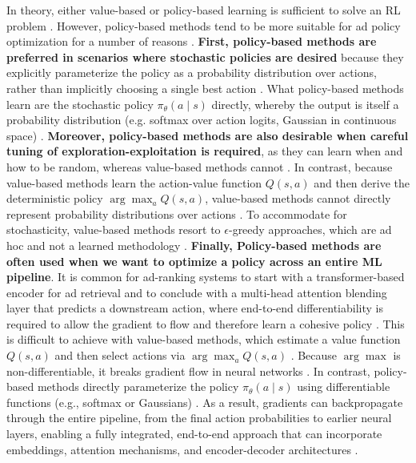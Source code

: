 \documentclass[final]{anthology-ch}         %
\begin{document}
In theory, either value-based or policy-based learning is sufficient to solve an RL problem \cite{Sutton1998, kaelbling1996reinforcement}. However, policy-based methods tend to be more suitable for ad policy optimization for a number of reasons \cite{chen2022off, gauci2018horizon}. \textbf{First, policy-based methods are preferred in scenarios where stochastic policies are desired} because they explicitly parameterize the policy as a probability distribution over actions, rather than implicitly choosing a single best action \cite{williams1992simple, Sutton1998}. What policy-based methods learn are the stochastic policy   $\pi_\theta(a \mid s)$ directly, whereby the output is itself a probability distribution (e.g. softmax over action logits, Gaussian in continuous space) \cite{Sutton1998, schulman2015trust}. \textbf{Moreover, policy-based methods are also desirable when careful tuning of exploration-exploitation is required}, as they can learn when and how to be random, whereas value-based methods cannot \cite{Sutton1998, williams1992simple, schulman2015trust}. In contrast, because value-based methods learn the action-value function $Q(s,a)$ and then derive the deterministic policy $\arg\max_a Q(s, a)$, value-based methods cannot directly represent probability distributions over actions \cite{Sutton1998, dulac2019challenges}. To accommodate for stochasticity, value-based methods resort to $\epsilon$-greedy approaches, which are ad hoc and not a learned methodology \cite{Sutton1998, kaelbling1996reinforcement}. \textbf{Finally, Policy-based methods are often used when we want to optimize a policy across an entire ML pipeline}\cite{Sutton1998, chen2022off}. It is common for ad-ranking systems to start with a transformer-based encoder for ad retrieval and to conclude with a multi-head attention blending layer that predicts a downstream action, where end-to-end differentiability is required to allow the gradient to flow and therefore learn a cohesive policy \cite{zhao2021dear, xia2023transact, pancha2022pinnerformer}. This is difficult to achieve with value-based methods, which estimate a value function \(Q(s, a)\) and then select actions via \(\arg\max_{a} Q(s, a)\) \cite{Sutton1998, dulac2019challenges}. Because \(\arg\max\) is non-differentiable, it breaks gradient flow in neural networks \cite{Sutton1998, dulac2019challenges}. In contrast, policy-based methods directly parameterize the policy \(\pi_\theta(a \mid s)\) using differentiable functions (e.g., softmax or Gaussians) \cite{Sutton1998, williams1992simple}. As a result, gradients can backpropagate through the entire pipeline, from the final action probabilities to earlier neural layers, enabling a fully integrated, end-to-end approach that can incorporate embeddings, attention mechanisms, and encoder-decoder architectures \cite{chen2022off, zhao2021dear, xia2023transact}.
\end{document}
